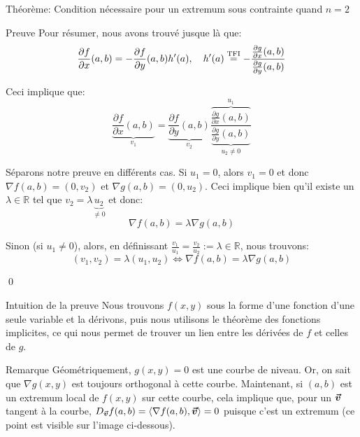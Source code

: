 \documentclass[a4paper]{article}
\begin{document}
\begin{parag}{Théorème: Condition nécessaire pour un extremum sous contrainte quand $n=2$}
\begin{subparag}{Preuve}
        Pour résumer, nous avons trouvé jusque là que:
        \[\frac{\partial f}{\partial x}\left(a, b\right) = -\frac{\partial f}{\partial y}\left(a, b\right) h'\left(a\right), \mathspace h'\left(a\right) \over{=}{TFI} -\frac{\frac{\partial g}{\partial x}\left(a, b\right)}{\frac{\partial g}{\partial y}\left(a, b\right)}\]
        
        Ceci implique que:
        \[\underbrace{\frac{\partial f}{\partial x}\left(a, b\right)}_{v_1} = \underbrace{\frac{\partial f}{\partial y}\left(a, b\right)}_{v_2} \frac{\overbrace{\frac{\partial g}{\partial x}\left(a, b\right)}^{u_1}}{\underbrace{\frac{\partial g}{\partial y}\left(a, b\right)}_{u_2 \neq0}}\]
        
        Séparons notre preuve en différents cas. Si $u_1 = 0$, alors $v_1 = 0$ et donc $\nabla f\left(a, b\right) = \left(0, v_2\right)$ et $\nabla g\left(a, b\right) = \left(0, u_2\right)$. Ceci implique bien qu'il existe un $\lambda \in \mathbb{R}$ tel que $v_2 = \lambda \underbrace{u_2}_{\neq 0}$ et donc: 
        \[\nabla f\left(a, b\right) = \lambda \nabla g\left(a, b\right)\]
        
        Sinon (si $u_1 \neq 0$), alors, en définissant $\frac{v_1}{u_1} = \frac{v_2}{u_2} := \lambda \in \mathbb{R}$, nous trouvons:
        \[\left(v_1, v_2\right) = \lambda\left(u_1, u_2\right) \iff \nabla f\left(a, b\right) = \lambda \nabla g\left(a, b\right)\]
         
        \qed
    \end{subparag}

    \begin{subparag}{Intuition de la preuve}
        Nous trouvons $f\left(x, y\right)$ sous la forme d'une fonction d'une seule variable et la dérivons, puis nous utilisons le théorème des fonctions implicites, ce qui nous permet de trouver un lien entre les dérivées de $f$ et celles de $g$.
    \end{subparag}

    \begin{subparag}{Remarque}
        Géométriquement, $g\left(x, y\right) = 0$ est une courbe de niveau. Or, on sait que $\nabla g\left(x, y\right)$ est toujours orthogonal à cette courbe. Maintenant, si $\left(a, b\right)$ est un extremum local de $f\left(x, y\right)$ sur cette courbe, cela implique que, pour un $\bm{\protect\vec{v}}$ tangent à la courbe, $D_{\bvec{v}}f\left(a, b\right) = \left<\nabla f\left(a, b\right), \bvec{v}\right> = 0$ puisque c'est un extremum (ce point est visible sur l'image ci-dessous).


\end{subparag}
\end{parag}
\end{document}
